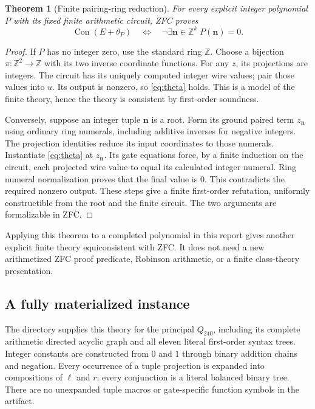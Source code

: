 \documentclass[11pt]{article}
\newtheorem{theorem}{Theorem}[section]
\theoremstyle{remark}\newtheorem{remark}[theorem]{Remark}
\newcommand{\Z}{\mathbb Z}
\newcommand{\Con}{\operatorname{Con}}
\newcommand{\code}[1]{\texttt{\detokenize{#1}}}
\begin{document}
\begin{theorem}[Finite pairing-ring reduction]\label{thm:ring}
For every explicit integer polynomial $P$ with its fixed finite
arithmetic circuit, ZFC proves
\[
\Con(E+\theta_P)
\quad\Longleftrightarrow\quad
\neg\exists\boldsymbol n\in\Z^k\;P(\boldsymbol n)=0.
\]
\end{theorem}

\begin{proof}
If $P$ has no integer zero, use the standard ring $\Z$. Choose a
bijection $\pi:\Z^2\to\Z$ with its two inverse coordinate functions.
For any $z$, its projections are integers. The circuit has its uniquely
computed integer wire values; pair those values into $u$. Its output
is nonzero, so \eqref{eq:theta} holds. This is a model of the finite
theory, hence the theory is consistent by first-order soundness.

Conversely, suppose an integer tuple $\boldsymbol n$ is a root.
Form its ground paired term $z_{\boldsymbol n}$ using ordinary ring
numerals, including additive inverses for negative integers.
The projection identities reduce its input coordinates to those
numerals. Instantiate \eqref{eq:theta} at $z_{\boldsymbol n}$.
Its gate equations force, by a finite induction on the circuit,
each projected wire value to equal its calculated integer numeral.
Ring numeral normalization proves that the final value is $0$.
This contradicts the required nonzero output. These steps give a
finite first-order refutation, uniformly constructible from the root
and the finite circuit. The two arguments are formalizable in ZFC.
\end{proof}

Applying this theorem to a completed polynomial in this report gives
another explicit finite theory equiconsistent with ZFC. It does not
need a new arithmetized ZFC proof predicate, Robinson arithmetic, or a
finite class-theory presentation.

\subsection{A fully materialized instance}

The directory \code{finite_theory/} supplies this theory for the principal
$Q_{240}$, including its complete arithmetic directed acyclic graph
and all eleven literal first-order syntax trees. Integer constants are
constructed from $0$ and $1$ through binary addition chains and
negation. Every occurrence of a tuple projection is expanded into
compositions of $\ell$ and $r$; every conjunction is a literal balanced
binary tree. There are no unexpanded tuple macros or gate-specific
function symbols in the artifact.
\end{document}
